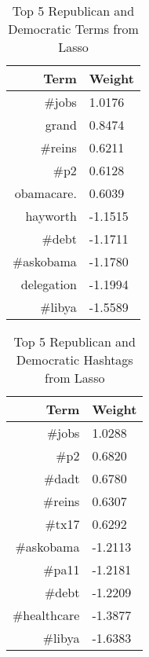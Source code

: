 \documentclass[10pt]{article}
\begin{document}
\begin{table}[htdp]
\caption{Top 5 Republican and Democratic Terms from Lasso}
\begin{center}
\begin{tabular}{|r|l|}
\hline
Term & Weight \\
\hline
\#jobs & 1.0176 \\
grand & 0.8474 \\
\#reins & 0.6211 \\
\#p2 & 0.6128 \\
obamacare. & 0.6039 \\
\hline
hayworth & -1.1515 \\
\#debt & -1.1711 \\
\#askobama & -1.1780 \\
delegation & -1.1994 \\
\#libya & -1.5589 \\
\hline
\end{tabular}
\end{center}
\end{table}

\begin{table}[htdp]
\caption{Top 5 Republican and Democratic Hashtags from Lasso}
\begin{center}
\begin{tabular}{|r|l|}
\hline
Term & Weight \\
\hline
\#jobs & 1.0288 \\
\#p2 & 0.6820 \\
\#dadt & 0.6780 \\
\#reins & 0.6307 \\
\#tx17 & 0.6292 \\
\hline
\#askobama & -1.2113 \\
\#pa11 & -1.2181 \\
\#debt & -1.2209 \\
\#healthcare & -1.3877 \\
\#libya & -1.6383 \\
\hline
\end{tabular}
\end{center}
\end{table}
\end{document}
